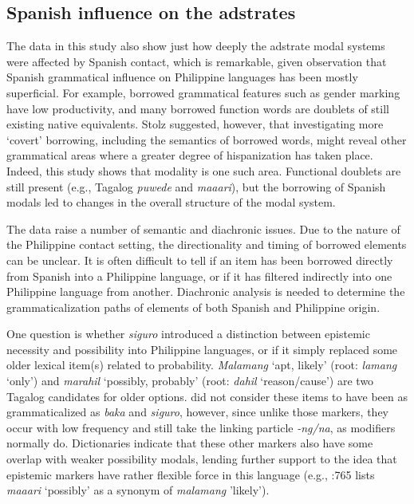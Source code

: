 \subsection{Spanish influence on the adstrates}

The data in this study also show just how deeply the adstrate modal systems were affected by Spanish contact, which is remarkable, given  observation that Spanish grammatical influence on Philippine languages has been mostly superficial. For example, borrowed grammatical features such as gender marking have low productivity, and many borrowed function words are doublets of still existing native equivalents. Stolz suggested, however, that investigating more ‘covert’ borrowing, including the semantics of borrowed words, might reveal other grammatical areas where a greater degree of hispanization has taken place. Indeed, this study shows that modality is one such area. Functional doublets are still present (e.g., Tagalog \textit{puwede} and \textit{maaari}), but the borrowing of Spanish modals led to changes in the overall structure of the modal system.

The data raise a number of semantic and diachronic issues. Due to the nature of the Philippine contact setting, the directionality and timing of borrowed elements can be unclear. It is often difficult to tell if an item has been borrowed directly from Spanish into a Philippine language, or if it has filtered indirectly into one Philippine language from another. Diachronic analysis is needed to determine the grammaticalization paths of elements of both Spanish and Philippine origin. 

One question is whether \textit{siguro} introduced a distinction between epistemic necessity and possibility into Philippine languages, or if it simply replaced some older lexical item(s) related to probability. \textit{Malamang} ‘apt, likely’ (root: \textit{lamang} ‘only’) and \textit{marahil} ‘possibly, probably’ (root: \textit{dahil} ‘reason/cause’) are two Tagalog candidates for older options. \citet{BaderEtAl1994} did not consider these items to have been as grammaticalized as \textit{baka} and \textit{siguro}, however, since unlike those markers, they occur with low frequency and still take the linking particle \textit{{}-ng/na}, as modifiers normally do. Dictionaries indicate that these other markers also have some overlap with weaker possibility modals, lending further support to the idea that epistemic markers have rather flexible force in this language (e.g., \citealt{English2010}:765 lists \textit{maaari} ‘possibly’ as a synonym of \textit{malamang} 'likely'). 


